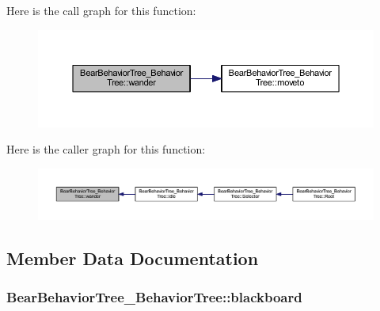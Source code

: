 Here is the call graph for this function\+:\nopagebreak
\begin{figure}[H]
\begin{center}
\leavevmode
\includegraphics[width=350pt]{class_bear_behavior_tree___behavior_tree_ac9bc4af1b6c0cd29a866334af35a0792_cgraph}
\end{center}
\end{figure}




Here is the caller graph for this function\+:\nopagebreak
\begin{figure}[H]
\begin{center}
\leavevmode
\includegraphics[width=350pt]{class_bear_behavior_tree___behavior_tree_ac9bc4af1b6c0cd29a866334af35a0792_icgraph}
\end{center}
\end{figure}




\subsection{Member Data Documentation}
\subsubsection[{\texorpdfstring{blackboard}{blackboard}}]{ Bear\+Behavior\+Tree\+\_\+\+Behavior\+Tree\+::blackboard}\hypertarget{class_bear_behavior_tree___behavior_tree_af65805184758188534eb2100723629d7}{}\label{class_bear_behavior_tree___behavior_tree_af65805184758188534eb2100723629d7}

